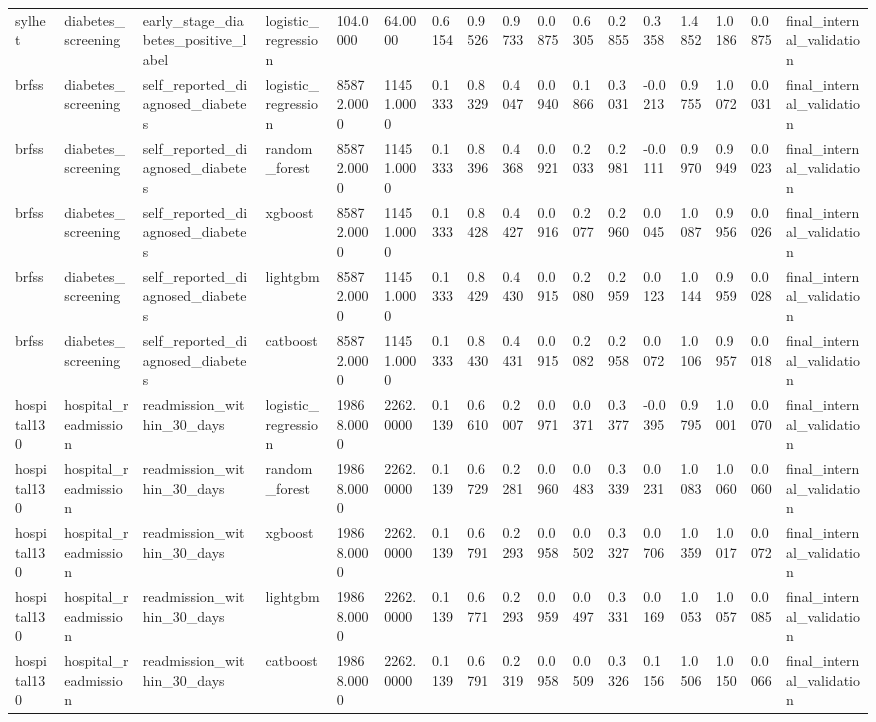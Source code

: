 \begin{tabular}{lllllllllllllllll}
sylhet & diabetes\_screening & early\_stage\_diabetes\_positive\_label & logistic\_regression & 104.0000 & 64.0000 & 0.6154 & 0.9526 & 0.9733 & 0.0875 & 0.6305 & 0.2855 & 0.3358 & 1.4852 & 1.0186 & 0.0875 & final\_internal\_validation \\
brfss & diabetes\_screening & self\_reported\_diagnosed\_diabetes & logistic\_regression & 85872.0000 & 11451.0000 & 0.1333 & 0.8329 & 0.4047 & 0.0940 & 0.1866 & 0.3031 & -0.0213 & 0.9755 & 1.0072 & 0.0031 & final\_internal\_validation \\
brfss & diabetes\_screening & self\_reported\_diagnosed\_diabetes & random\_forest & 85872.0000 & 11451.0000 & 0.1333 & 0.8396 & 0.4368 & 0.0921 & 0.2033 & 0.2981 & -0.0111 & 0.9970 & 0.9949 & 0.0023 & final\_internal\_validation \\
brfss & diabetes\_screening & self\_reported\_diagnosed\_diabetes & xgboost & 85872.0000 & 11451.0000 & 0.1333 & 0.8428 & 0.4427 & 0.0916 & 0.2077 & 0.2960 & 0.0045 & 1.0087 & 0.9956 & 0.0026 & final\_internal\_validation \\
brfss & diabetes\_screening & self\_reported\_diagnosed\_diabetes & lightgbm & 85872.0000 & 11451.0000 & 0.1333 & 0.8429 & 0.4430 & 0.0915 & 0.2080 & 0.2959 & 0.0123 & 1.0144 & 0.9959 & 0.0028 & final\_internal\_validation \\
brfss & diabetes\_screening & self\_reported\_diagnosed\_diabetes & catboost & 85872.0000 & 11451.0000 & 0.1333 & 0.8430 & 0.4431 & 0.0915 & 0.2082 & 0.2958 & 0.0072 & 1.0106 & 0.9957 & 0.0018 & final\_internal\_validation \\
hospital130 & hospital\_readmission & readmission\_within\_30\_days & logistic\_regression & 19868.0000 & 2262.0000 & 0.1139 & 0.6610 & 0.2007 & 0.0971 & 0.0371 & 0.3377 & -0.0395 & 0.9795 & 1.0001 & 0.0070 & final\_internal\_validation \\
hospital130 & hospital\_readmission & readmission\_within\_30\_days & random\_forest & 19868.0000 & 2262.0000 & 0.1139 & 0.6729 & 0.2281 & 0.0960 & 0.0483 & 0.3339 & 0.0231 & 1.0083 & 1.0060 & 0.0060 & final\_internal\_validation \\
hospital130 & hospital\_readmission & readmission\_within\_30\_days & xgboost & 19868.0000 & 2262.0000 & 0.1139 & 0.6791 & 0.2293 & 0.0958 & 0.0502 & 0.3327 & 0.0706 & 1.0359 & 1.0017 & 0.0072 & final\_internal\_validation \\
hospital130 & hospital\_readmission & readmission\_within\_30\_days & lightgbm & 19868.0000 & 2262.0000 & 0.1139 & 0.6771 & 0.2293 & 0.0959 & 0.0497 & 0.3331 & 0.0169 & 1.0053 & 1.0057 & 0.0085 & final\_internal\_validation \\
hospital130 & hospital\_readmission & readmission\_within\_30\_days & catboost & 19868.0000 & 2262.0000 & 0.1139 & 0.6791 & 0.2319 & 0.0958 & 0.0509 & 0.3326 & 0.1156 & 1.0506 & 1.0150 & 0.0066 & final\_internal\_validation \\
\hline
\end{tabular}
